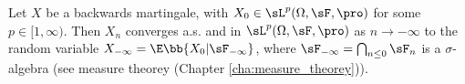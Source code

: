 



\begin{theorem}\label{thm:backwards_martingale_as_lp_closed_discrete}
Let $X$ be a backwards martingale, with $X_0 \in \sL^p(\Omega,\sF,\pro)$ for some $p \in [1,\infty)$. Then $X_n$ converges a.s. and in $\sL^p(\Omega,\sF,\pro)$ as $n \to -\infty$ to the random variable $X_{-\infty} = \E\bb{X_0|\sF_{-\infty}}$, where $\sF_{-\infty} = \bigcap_{n\leq 0}\sF_n$ is a $\sigma$-algebra (see measure theorey (Chapter \ref{cha:measure_theorey})).
\end{theorem}

